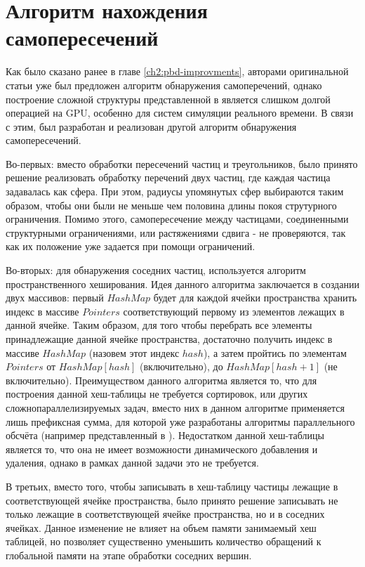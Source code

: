 \section{Алгоритм нахождения самопересечений} \label{ch3:selfCollision}
	Как было сказано ранее в главе \ref{ch2:pbd-improvments}, авторами оригинальной статьи уже был предложен алгоритм обнаружения самоперечений, однако построение сложной структуры представленной в \cite{teschner2003optimized} является слишком долгой операцией на GPU, особенно для систем симуляции реального времени. В связи с этим, был разработан и реализован другой алгоритм обнаружения самопересечений.
	
	Во-первых: вместо обработки пересечений частиц и треугольников, было принято решение реализовать обработку перечений двух частиц, где каждая частица задавалась как сфера. При этом, радиусы упомянутых сфер выбираются таким образом, чтобы они были не меньше чем половина длины покоя струтурного ограничения. Помимо этого, самопересечение между частицами, соединенными структурными ограничениями, или растяжениями сдвига - не проверяются, так как их положение уже задается при помощи ограничений.
	
	Во-вторых: для обнаружения соседних частиц, используется алгоритм пространственного хеширования\cite{hashing2023}. Идея данного алгоритма заключается в создании двух массивов: первый $HashMap$ будет для каждой ячейки пространства хранить индекс в массиве $Pointers$ соответствующий первому из элементов лежащих в данной ячейке. Таким образом, для того чтобы перебрать все элементы принадлежащие данной ячейке пространства, достаточно получить индекс в массиве $HashMap$ (назовем этот индекс $hash$), а затем пройтись по элементам $Pointers$ от $HashMap[hash]$ (включительно), до $HashMap[hash + 1]$ (не включительно). Преимуществом данного алгоритма является то, что для построения данной хеш-таблицы не требуется сортировок, или других сложнопараллелизируемых задач, вместо них в данном алгоритме применяется лишь префиксная сумма, для которой уже разработаны алгоритмы параллельного обсчёта (например представленный в \cite{hillis1986data}). Недостатком данной хеш-таблицы является то, что она не имеет возможности динамического добавления и удаления, однако в рамках данной задачи это не требуется.
	
	В третьих, вместо того, чтобы записывать в хеш-таблицу частицы лежащие в соответствующей ячейке пространства, было принято решение записывать не только лежащие в соответствующей ячейке пространства, но и в соседних ячейках. Данное изменение не влияет на объем памяти занимаемый хеш таблицей, но позволяет существенно уменьшить количество обращений к глобальной памяти на этапе обработки соседних вершин.
	
